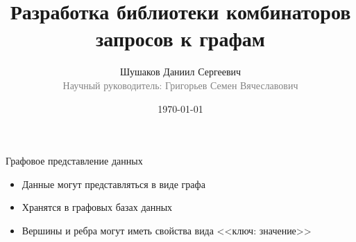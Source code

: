 \documentclass[aspectratio=169]{beamer}
\begin{document}
\title[Комбинаторы запросов к графам]
{
  Разработка библиотеки комбинаторов запросов к графам
}
\author[Шушаков Д.С.]
{
Шушаков Даниил Сергеевич\\
{\footnotesize\textcolor{gray}{Научный руководитель: Григорьев Семен Вячеславович}}\\
}


\date{\today}
\frame{\titlepage\thispagestyle{empty}}

\setlength{\parskip}{0.25cm}



\begin{frame}{Графовое представление данных}
  \begin{itemize}
    \item Данные могут представляться в виде графа
    \item Хранятся в графовых базах данных
    \item Вершины и ребра могут иметь свойства вида <<ключ: значение>>
  \end{itemize}

\end{frame}


\end{document}
